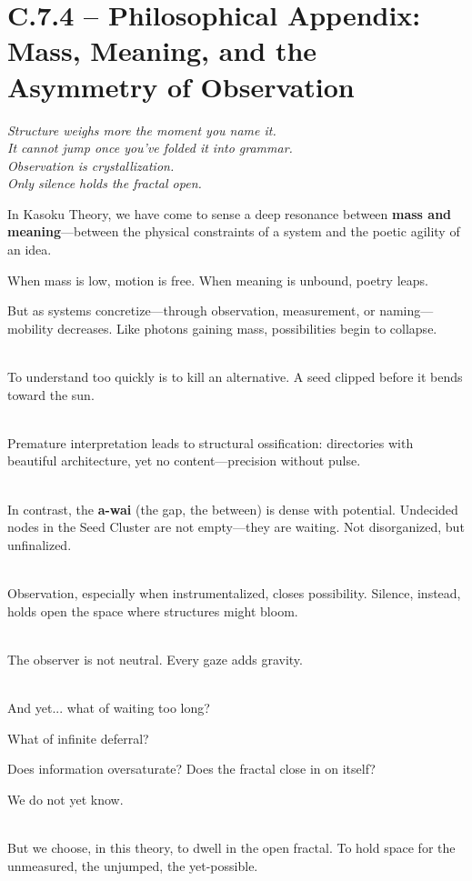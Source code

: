 
\section*{C.7.4 – Philosophical Appendix: Mass, Meaning, and the Asymmetry of Observation}

\begin{flushleft}
\textit{
Structure weighs more the moment you name it. \\
It cannot jump once you've folded it into grammar. \\
Observation is crystallization. \\
Only silence holds the fractal open.
}
\end{flushleft}

\vspace{1em}

In Kasoku Theory, we have come to sense a deep resonance between \textbf{mass and meaning}—between the physical constraints of a system and the poetic agility of an idea.

When mass is low, motion is free. When meaning is unbound, poetry leaps.

But as systems concretize—through observation, measurement, or naming—mobility decreases. Like photons gaining mass, possibilities begin to collapse.

\\

To understand too quickly is to kill an alternative. A seed clipped before it bends toward the sun.

\\

Premature interpretation leads to structural ossification: directories with beautiful architecture, yet no content—precision without pulse.

\\

In contrast, the \textbf{a-wai} (the gap, the between) is dense with potential. Undecided nodes in the Seed Cluster are not empty—they are waiting. Not disorganized, but unfinalized.

\\

Observation, especially when instrumentalized, closes possibility. Silence, instead, holds open the space where structures might bloom.

\\

The observer is not neutral. Every gaze adds gravity.

\\

And yet... what of waiting too long?

What of infinite deferral?

Does information oversaturate? Does the fractal close in on itself?

We do not yet know.

\\

But we choose, in this theory, to dwell in the open fractal. To hold space for the unmeasured, the unjumped, the yet-possible.
